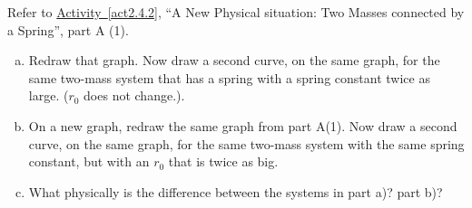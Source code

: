 \label{fnt2.4.2-1}

Refer to \hyperref[act2.4.2]{Activity~\ref*{act2.4.2}}, ``A New Physical situation: Two Masses connected by a Spring'', part A (1).

\begin{enumerate}[(a)]
	\item Redraw that graph.  Now draw a second curve, on the same graph, for the same two-mass system that has a spring with a spring constant twice as large.  ($r_0$ does not change.).
	
	\item On a new graph, redraw the same graph from part A(1).  Now draw a second curve, on the same graph, for the same two-mass system with the same spring constant, but with an $r_0$ that is twice as big.
	
	\item What physically is the difference between the systems in part a)? part b)?
\end{enumerate}